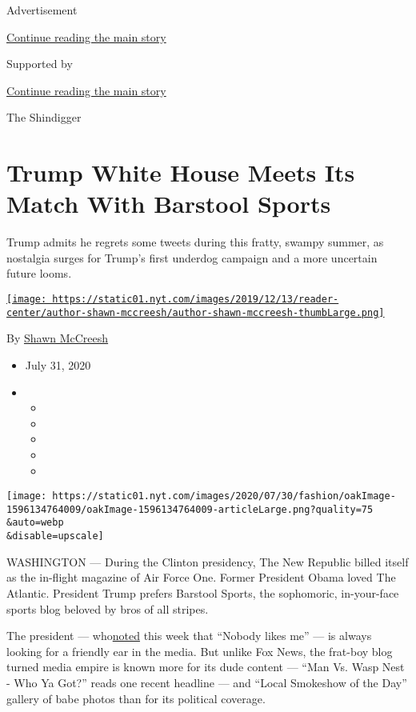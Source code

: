 Advertisement

\protect\hyperlink{after-top}{Continue reading the main story}

Supported by

\protect\hyperlink{after-sponsor}{Continue reading the main story}

The Shindigger

\hypertarget{trump-white-house-meets-its-match-with-barstool-sports}{%
\section{Trump White House Meets Its Match With Barstool
Sports}\label{trump-white-house-meets-its-match-with-barstool-sports}}

Trump admits he regrets some tweets during this fratty, swampy summer,
as nostalgia surges for Trump's first underdog campaign and a more
uncertain future looms.

\href{https://www.nytimes.com/by/shawn-mccreesh}{\texttt{[image: https://static01.nyt.com/images/2019/12/13/reader-center/author-shawn-mccreesh/author-shawn-mccreesh-thumbLarge.png]}}

By \href{https://www.nytimes.com/by/shawn-mccreesh}{Shawn McCreesh}

\begin{itemize}
\item
  July 31, 2020
\item
  \begin{itemize}
  \item
  \item
  \item
  \item
  \item
  \end{itemize}
\end{itemize}

\texttt{[image: https://static01.nyt.com/images/2020/07/30/fashion/oakImage-1596134764009/oakImage-1596134764009-articleLarge.png?quality=75\\\&auto=webp\\\&disable=upscale]}

WASHINGTON --- During the Clinton presidency, The New Republic billed
itself as the in-flight magazine of Air Force One. Former President
Obama loved The Atlantic. President Trump prefers Barstool Sports, the
sophomoric, in-your-face sports blog beloved by bros of all stripes.

The president ---
who\href{https://www.nytimes.com/2020/07/28/us/politics/trump-nobody-likes-me-walks-out-briefing.html}{noted}
this week that ``Nobody likes me'' --- is always looking for a friendly
ear in the media. But unlike Fox News, the frat-boy blog turned media
empire is known more for its dude content --- ``Man Vs. Wasp Nest - Who
Ya Got?'' reads one recent headline --- and ``Local Smokeshow of the
Day'' gallery of babe photos than for its political coverage.

